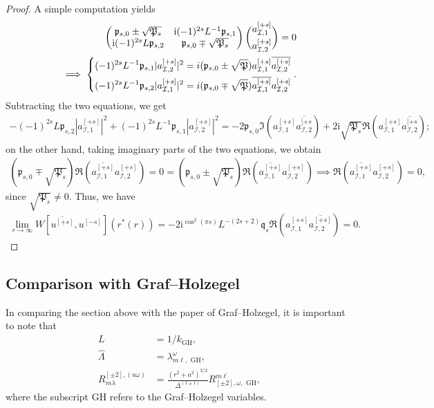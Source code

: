 \documentclass[11pt]{article}
\newcommand{\ii}{\mathrm{i}}
\newcommand{\cI}{\mathcal I}
\numberwithin{equation}{section}
\begin{document}
\begin{proof} A simple computation yields
\begin{align*}
\begin{pmatrix}
\mathfrak p_{s,0}\pm\sqrt{\mathfrak P_s}
&
\ii (-1)^{2s }L^{-1}\mathfrak p_{s,1}
\\
\ii (-1)^{2s} L\mathfrak p_{s,2}
&
\mathfrak p_{s,0}\mp\sqrt{\mathfrak P_s}
\end{pmatrix}\binom{a_{\cI,1}^{[+s]}}{a_{\cI,2}^{[+s]}}=0 \\
\implies 
\begin{dcases}
(-1)^{2s}L^{-1}\mathfrak p_{s,1}|a_{\cI,2}^{[+s]}|^2=i(\mathfrak p_{s,0}\pm\sqrt{\mathfrak P})a_{\cI,1}^{[+s]}\overline{a_{\cI,2}^{[+s]}}\\
(-1)^{2s}L^{-1}\mathfrak p_{s,2}|a_{\cI,1}^{[+s]}|^2=i(\mathfrak p_{s,0}\mp\sqrt{\mathfrak P})\overline{a_{\cI,1}^{[+s]}}a_{\cI,2}^{[+s]}
\end{dcases}.
\end{align*}
Subtracting the two equations, we get
\begin{align*}
-(-1)^{2s}L\mathfrak p_{s,2}|a_{\cI,1}^{[+s]}|^2
+(-1)^{2s} L^{-1}\mathfrak p_{s,1}|a_{\cI,2}^{[+s]}|^2=-2\mathfrak p_{s,0}\Im(a_{\cI,1}^{[+s]}\overline{a_{\cI,2}^{[+s}})+2\ii \sqrt{\mathfrak P_s} \Re(a_{\cI,1}^{[+s]}\overline{a_{\cI,2}^{[+s}});
\end{align*}
on the other hand, taking imaginary parts of the two equations, we obtain
\begin{align*}
(\mathfrak p_{s,0}\mp\sqrt{\mathfrak P_s})\Re(\overline{a_{\cI,1}^{[+s]}}a_{\cI,2}^{[+s]})=0=(\mathfrak p_{s,0}\pm\sqrt{\mathfrak P_s})\Re(\overline{a_{\cI,1}^{[+s]}}a_{\cI,2}^{[+s]})\implies \Re(\overline{a_{\cI,1}^{[+s]}}a_{\cI,2}^{[+s]})=0,
\end{align*}
since $\sqrt{\mathfrak P_s}\neq 0$. Thus, we have
\begin{align*}
\lim_{r\to \infty}W[\overline{u^{[+s]}},u^{[-s]}](r^*(r))=-2\ii^{\cos^2(\pi s)}L^{-(2s+2)}
\mathfrak q_{s}\Re(a_{\cI,1}^{[+s]}\overline{a_{\cI,2}^{[+s]}})=0.
\end{align*}
\end{proof}


\subsection{Comparison with Graf--Holzegel}

In comparing the section above with the paper of Graf--Holzegel, it is important to note that 
\begin{align*}
L&=1/k_{\text{GH}},\\
\hat \Lambda&=\lambda_{m\ell,\text{~GH}}^{\omega},\\
R_{m\lambda}^{[\pm 2],(a\omega)}&= \frac{(r^2+a^2)^{3/2}}{\Delta^{(1\pm 1)}}R^{m\ell}_{[\pm 2],\omega, \text{~GH}},
\end{align*}
where the subscript GH refers to the Graf--Holzegel variables.
\end{document}
